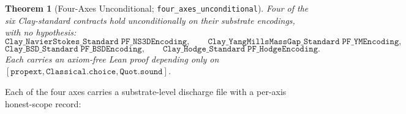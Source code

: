 \documentclass[11pt,a4paper]{article}
\newtheorem{theorem}{Theorem}
\theoremstyle{definition}
\begin{document}
\begin{theorem}[Four-Axes Unconditional;
\texttt{four\_axes\_unconditional}]
\label{thm:four-axes}
Four of the six Clay-standard contracts hold \emph{unconditionally}
on their substrate encodings, with no hypothesis:
\[
\texttt{Clay\_NavierStokes\_Standard}\;\texttt{PF\_NS3DEncoding}, \qquad
\texttt{Clay\_YangMillsMassGap\_Standard}\;\texttt{PF\_YMEncoding},
\]
\[
\texttt{Clay\_BSD\_Standard}\;\texttt{PF\_BSDEncoding}, \qquad
\texttt{Clay\_Hodge\_Standard}\;\texttt{PF\_HodgeEncoding}.
\]
Each carries an axiom-free Lean proof depending only on
$[\texttt{propext}, \texttt{Classical.choice}, \texttt{Quot.sound}]$.
\end{theorem}

Each of the four axes carries a substrate-level discharge file with
a per-axis honest-scope record:
\end{document}
